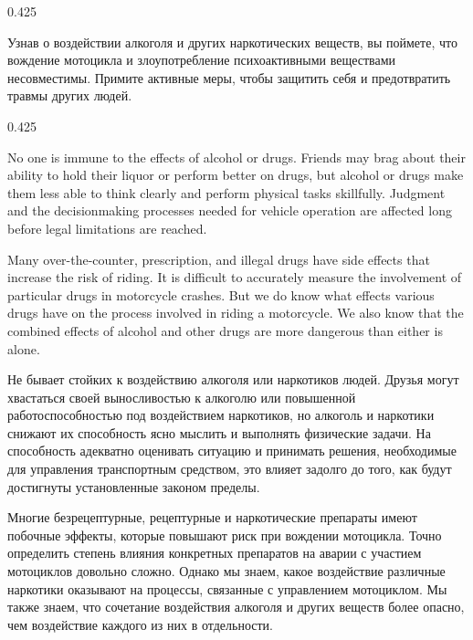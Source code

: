 \begin{langblock}{0.425}
\begin{rus}
		
		Узнав о воздействии алкоголя и других наркотических веществ, вы поймете, что вождение мотоцикла и злоупотребление психоактивными веществами несовместимы. Примите активные меры, чтобы защитить себя и предотвратить травмы других людей.
\end{rus}
\end{langblock}





\begin{langblock}{0.425}
	\begin{eng}
	
	No one is immune to the effects of alcohol or drugs. Friends may brag about their ability to hold their liquor or perform better on drugs, but alcohol or drugs make them less able to think clearly and perform physical tasks skillfully. Judgment and the decisionmaking processes needed for vehicle operation are affected long before legal limitations are reached.
	
	
	Many over-the-counter, prescription, and illegal drugs have side effects that increase the risk of riding. It is difficult to accurately measure the involvement of particular drugs in motorcycle crashes. But we do know what effects various drugs have on the process involved in riding a motorcycle. We also know that the combined effects of alcohol and other drugs are more dangerous than either is alone.
	\end{eng}
	\begin{rus}
		
		Не бывает стойких к воздействию алкоголя или наркотиков людей. Друзья могут хвастаться своей выносливостью к алкоголю или повышенной работоспособностью под воздействием наркотиков, но алкоголь и наркотики снижают их способность ясно мыслить и выполнять физические задачи. На способность адекватно оценивать ситуацию и принимать решения, необходимые для управления транспортным средством, это влияет задолго до того, как будут достигнуты установленные законом пределы.
		
		
		Многие безрецептурные, рецептурные и наркотические препараты имеют побочные эффекты, которые повышают риск при вождении мотоцикла. Точно определить степень влияния конкретных препаратов на аварии с участием мотоциклов довольно сложно. Однако мы знаем, какое воздействие различные наркотики оказывают на процессы, связанные с управлением мотоциклом. Мы также знаем, что сочетание воздействия алкоголя и других веществ более опасно, чем воздействие каждого из них в отдельности.
\end{rus}
\end{langblock}





